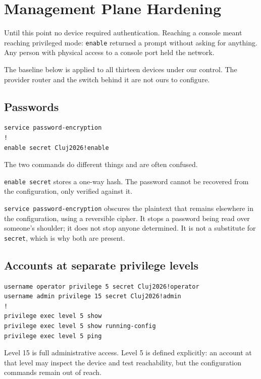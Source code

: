 \documentclass[12pt,a4paper]{article}
\begin{document}
\section{Management Plane Hardening}

Until this point no device required authentication. Reaching a console meant
reaching privileged mode: \texttt{enable} returned a prompt without asking for
anything. Any person with physical access to a console port held the network.

The baseline below is applied to all thirteen devices under our control. The
provider router and the switch behind it are not ours to configure.

\subsection{Passwords}

\begin{lstlisting}
service password-encryption
!
enable secret Cluj2026!enable
\end{lstlisting}

The two commands do different things and are often confused.

\texttt{enable secret} stores a one-way hash. The password cannot be recovered
from the configuration, only verified against it.

\texttt{service password-encryption} obscures the plaintext that remains
elsewhere in the configuration, using a reversible cipher. It stops a password
being read over someone's shoulder; it does not stop anyone determined. It is
not a substitute for \texttt{secret}, which is why both are present.

\subsection{Accounts at separate privilege levels}

\begin{lstlisting}
username operator privilege 5 secret Cluj2026!operator
username admin privilege 15 secret Cluj2026!admin
!
privilege exec level 5 show
privilege exec level 5 show running-config
privilege exec level 5 ping
\end{lstlisting}

Level 15 is full administrative access. Level 5 is defined explicitly: an
account at that level may inspect the device and test reachability, but the
configuration commands remain out of reach.
\end{document}
